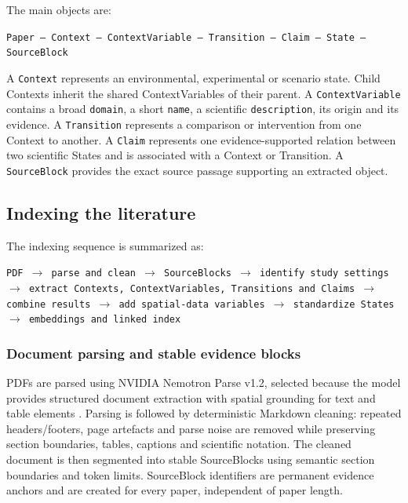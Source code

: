 \documentclass[10pt,twocolumn]{article}
\begin{document}
The main objects are:

\begin{center}
\small
\texttt{Paper -- Context -- ContextVariable -- Transition -- Claim -- State -- SourceBlock}
\end{center}

A \texttt{Context} represents an environmental, experimental or scenario state. Child Contexts inherit the shared ContextVariables of their parent. A \texttt{ContextVariable} contains a broad \texttt{domain}, a short \texttt{name}, a scientific \texttt{description}, its origin and its evidence. A \texttt{Transition} represents a comparison or intervention from one Context to another. A \texttt{Claim} represents one evidence-supported relation between two scientific States and is associated with a Context or Transition. A \texttt{SourceBlock} provides the exact source passage supporting an extracted object.

\subsection{Indexing the literature}
\label{sec:indexing}

The indexing sequence is summarized as:

\begin{center}
\small
\texttt{PDF $\rightarrow$ parse and clean $\rightarrow$ SourceBlocks $\rightarrow$ identify study settings $\rightarrow$ extract Contexts, ContextVariables, Transitions and Claims $\rightarrow$ combine results $\rightarrow$ add spatial-data variables $\rightarrow$ standardize States $\rightarrow$ embeddings and linked index}
\end{center}

\subsubsection{Document parsing and stable evidence blocks}

PDFs are parsed using NVIDIA Nemotron Parse v1.2, selected because the model provides structured document extraction with spatial grounding for text and table elements \cite{nemotronparse}. Parsing is followed by deterministic Markdown cleaning: repeated headers/footers, page artefacts and parse noise are removed while preserving section boundaries, tables, captions and scientific notation. The cleaned document is then segmented into stable SourceBlocks using semantic section boundaries and token limits. SourceBlock identifiers are permanent evidence anchors and are created for every paper, independent of paper length.
\end{document}
